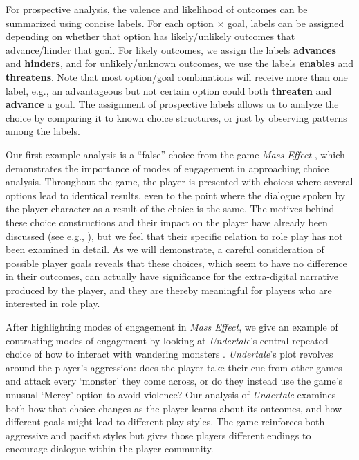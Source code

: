 \documentclass[arts,article,submit,moreauthors,pdftex,10pt,a4paper]{Definitions/mdpi}
\newcommand{\enables}{\textbf{\color{enables}enables}}
\newcommand{\advances}{\textbf{\color{advances}advances}}
\newcommand{\threatens}{\textbf{\color{threatens}threatens}}
\newcommand{\hinders}{\textbf{\color{hinders}hinders}}
\newcommand{\advancez}{\textbf{\color{advances}advance}}
\newcommand{\threatenz}{\textbf{\color{threatens}threaten}}
\begin{document}
\label{sec:prospective_labels}

For prospective analysis, the valence and likelihood of outcomes can be summarized using concise labels.
%
For each option $\times$ goal, labels can be assigned depending on whether that option has likely/unlikely outcomes that advance/hinder that goal.
%
For likely outcomes, we assign the labels \advances{} and \hinders{}, and for unlikely/unknown outcomes, we use the labels \enables{} and \threatens{}.
%
Note that most option/goal combinations will receive more than one label, e.g., an advantageous but not certain option could both \threatenz{} and \advancez{} a goal.
%
The assignment of prospective labels allows us to analyze the choice by comparing it to known choice structures, or just by observing patterns among the labels.


Our first example analysis is a ``false'' choice from the game \emph{Mass Effect} \citep{bioware2007mass}, which demonstrates the importance of modes of engagement in approaching choice analysis.
%
Throughout the game, the player is presented with choices where several options lead to identical results, even to the point where the dialogue spoken by the player character as a result of the choice is the same.
%
The motives behind these choice constructions and their impact on the player have already been discussed (see e.g., \cite{jorgensen2010game,bizzocchi2012mass,boyan2015massively}), but we feel that their specific relation to role play has not been examined in detail.
%
As we will demonstrate, a careful consideration of possible player goals reveals that these choices, which seem to have no difference in their outcomes, can actually have significance for the extra-digital narrative produced by the player, and they are thereby meaningful for players who are interested in role play.


After highlighting modes of engagement in \emph{Mass Effect}, we give an example of contrasting modes of engagement by looking at \emph{Undertale}'s central repeated choice of how to interact with wandering monsters \citep{fox2015undertale}.
%
\emph{Undertale}'s plot revolves around the player's aggression: does the player take their cue from other games and attack every `monster' they come across, or do they instead use the game's unusual `Mercy' option to avoid violence?
%
Our analysis of \emph{Undertale} examines both how that choice changes as the player learns about its outcomes, and how different goals might lead to different play styles.
%
The game reinforces both aggressive and pacifist styles but gives those players different endings to encourage dialogue within the player community.
\end{document}
